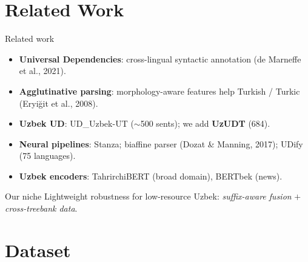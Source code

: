 \documentclass{beamer}
\begin{document}
\section{Related Work}
\begin{frame}{Related work}
\footnotesize
\begin{itemize}\setlength\itemsep{3pt}
  \item \textbf{Universal Dependencies}: cross-lingual syntactic
        annotation (de Marneffe et al., 2021).
  \item \textbf{Agglutinative parsing}: morphology-aware features help
        Turkish / Turkic (Eryi\u{g}it et al., 2008).
  \item \textbf{Uzbek UD}: UD\_Uzbek-UT ($\sim$500 sents); we add
        \textbf{UzUDT} (684).
  \item \textbf{Neural pipelines}: Stanza; biaffine parser
        (Dozat \& Manning, 2017); UDify (75 languages).
  \item \textbf{Uzbek encoders}: TahrirchiBERT (broad domain),
        BERTbek (news).
\end{itemize}
\vspace{0.3cm}
\begin{block}{Our niche}
\centering
Lightweight robustness for low-resource Uzbek:
\emph{suffix-aware fusion} $+$ \emph{cross-treebank data}.
\end{block}
\end{frame}

\section{Dataset}
\end{document}
